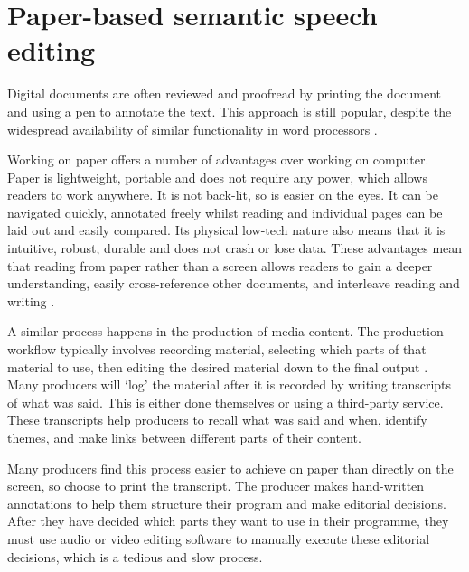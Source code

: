 \chapter{Paper-based semantic speech editing}\label{chp:paper}

Digital documents are often reviewed and proofread by printing the document and using a pen to annotate the text. This
approach is still popular, despite the widespread availability of similar functionality in word processors
\citep{Harper2001}.

Working on paper offers a number of advantages over working on computer.  Paper is lightweight, portable and does not
require any power, which allows readers to work anywhere.  It is not back-lit, so is easier on the eyes.
It can be navigated quickly, annotated freely whilst reading and individual pages can be laid out and easily compared.
Its physical low-tech nature also means that it is intuitive, robust, durable and does not crash or lose data.  These
advantages mean that reading from paper rather than a screen allows readers to gain a deeper understanding, easily
cross-reference other documents, and interleave reading and writing \citep{OHara1997, Mangen2013, Singer2017}.


A similar process happens in the production of media content. The production workflow typically involves recording
material, selecting which parts of that material to use, then editing the desired material down to the final output
\citep{Baume2015}.  Many producers will `log' the material after it is recorded by writing transcripts of what was
said.  This is either done themselves or using a third-party service. These transcripts help producers to recall what
was said and when, identify themes, and make links between different parts of their content.

Many producers find this process easier to achieve on paper than directly on the screen, so choose to print the
transcript. The producer makes hand-written annotations to help them structure their program and make editorial
decisions.  After they have decided which parts they want to use in their programme, they must use audio or video
editing software to manually execute these editorial decisions, which is a tedious and slow process.

